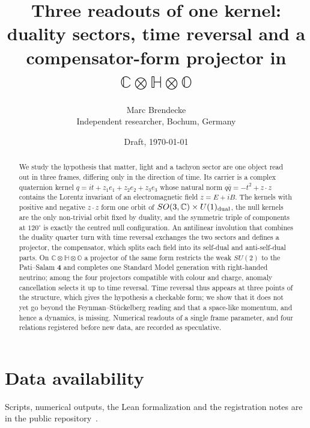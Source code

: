 \documentclass[11pt]{article}
\title{Three readouts of one kernel:\\ duality sectors, time reversal and a compensator-form projector in \(\mathbb C\otimes\mathbb H\otimes\mathbb O\)}
\author{Marc Brendecke\\ \small Independent researcher, Bochum, Germany}
\date{Draft, \today}
\theoremstyle{definition}
\theoremstyle{remark}
\begin{document}
\maketitle

\begin{abstract}
We study the hypothesis that matter, light and a tachyon sector are one object read out in three frames, differing only in the direction
of time.  Its carrier is a complex quaternion kernel \(q=it+z_1e_1+z_2e_2+z_3e_3\) whose natural norm \(q\bar q=-t^2+z\cdot z\) contains the Lorentz
invariant of an electromagnetic field \(z=E+iB\).  The kernels with positive and negative \(z\cdot z\) form one orbit of \(SO(3,\mathbb C)\times
U(1)_{\rm dual}\), the null kernels are the only non-trivial orbit fixed by duality, and the symmetric triple of components at \(120^\circ\) is
exactly the centred null configuration.  An antilinear involution that combines the duality quarter turn with time reversal exchanges the two
sectors and defines a projector, the compensator, which splits each field into its self-dual and anti-self-dual parts.  On
\(\mathbb C\otimes\mathbb H\otimes\mathbb O\) a projector of the same form restricts the weak \(SU(2)\) to the Pati--Salam \(\mathbf 4\) and
completes one Standard Model generation with right-handed neutrino; among the four projectors compatible with colour and charge, anomaly
cancellation selects it up to time reversal.  Time reversal thus appears at three points of the structure, which gives the hypothesis a
checkable form; we show that it does not yet go beyond the Feynman--St\"uckelberg reading and that a space-like momentum, and hence a
dynamics, is missing.  Numerical readouts of a single frame parameter, and four relations registered before new data, are recorded as
speculative.
\end{abstract}










\section*{Data availability}
Scripts, numerical outputs, the Lean formalization and the registration notes are in the public repository~\cite{repo}.

\appendix

\end{document}
